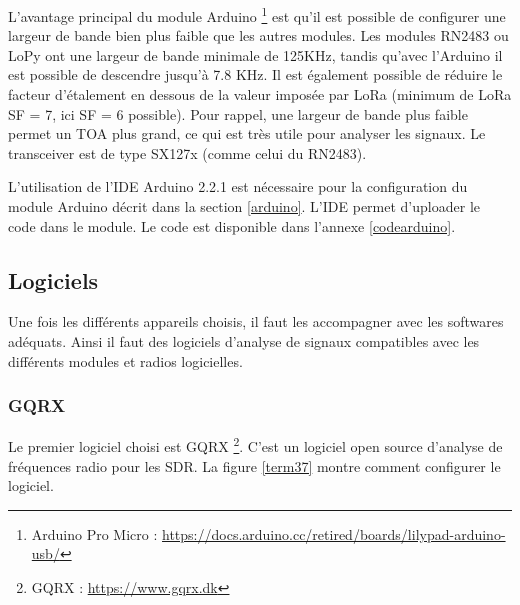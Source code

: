 L'avantage principal du module Arduino \footnote{Arduino Pro Micro : \href{https://docs.arduino.cc/retired/boards/lilypad-arduino-usb/}{https://docs.arduino.cc/retired/boards/lilypad-arduino-usb/}} est qu'il est possible de configurer une largeur de bande bien plus faible que les autres modules. Les modules RN2483 ou LoPy ont une largeur de bande minimale de 125KHz, tandis qu'avec l'Arduino il est possible de descendre jusqu'à 7.8 KHz. Il est également possible de réduire le facteur d'étalement en dessous de la valeur imposée par LoRa (minimum de LoRa SF = 7, ici SF = 6 possible). Pour rappel, une largeur de bande plus faible permet un \ac{TOA} plus grand, ce qui est très utile pour analyser les signaux. Le transceiver est de type SX127x (comme celui du RN2483).

\vspace{0.1cm}

L'utilisation de l'\ac{IDE} Arduino 2.2.1 est nécessaire pour la configuration du module Arduino décrit dans la section \ref{arduino}. L'\ac{IDE} permet d'uploader le code  dans le module. Le code est disponible dans l'annexe \ref{codearduino}.

\subsection{Logiciels}\label{fft}

Une fois les différents appareils choisis, il faut les accompagner avec les softwares adéquats. Ainsi il faut des logiciels d'analyse de signaux compatibles avec les différents modules et radios logicielles.

\subsubsection{GQRX}

Le premier logiciel choisi est GQRX \footnote{GQRX : \href{https://www.gqrx.dk}{https://www.gqrx.dk}}. C'est un logiciel open source d'analyse de fréquences radio pour les SDR. La figure \ref{term37} montre comment configurer le logiciel.

